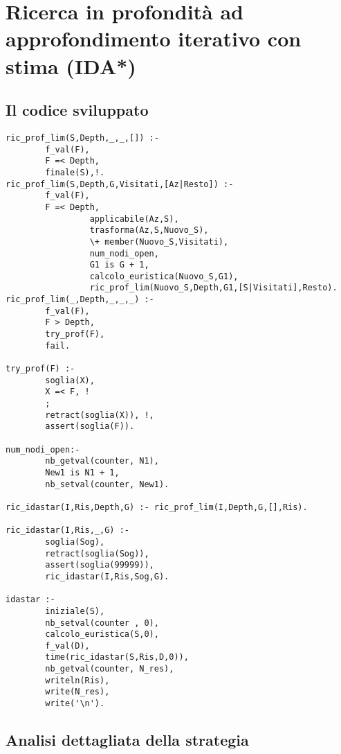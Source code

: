 \section{Ricerca in profondità ad approfondimento iterativo con stima (IDA*)}

\subsection{Il codice sviluppato}

\begin{lstlisting}
ric_prof_lim(S,Depth,_,_,[]) :-
        f_val(F),
        F =< Depth,
        finale(S),!.
ric_prof_lim(S,Depth,G,Visitati,[Az|Resto]) :-
        f_val(F),
        F =< Depth,
                 applicabile(Az,S),
                 trasforma(Az,S,Nuovo_S),
                 \+ member(Nuovo_S,Visitati),
                 num_nodi_open,
                 G1 is G + 1,
                 calcolo_euristica(Nuovo_S,G1),
                 ric_prof_lim(Nuovo_S,Depth,G1,[S|Visitati],Resto).
ric_prof_lim(_,Depth,_,_,_) :-
        f_val(F),
        F > Depth,
        try_prof(F),
        fail.

try_prof(F) :-
        soglia(X),
        X =< F, !
        ;
        retract(soglia(X)), !,
        assert(soglia(F)).

num_nodi_open:-
        nb_getval(counter, N1),
        New1 is N1 + 1,
        nb_setval(counter, New1).

ric_idastar(I,Ris,Depth,G) :- ric_prof_lim(I,Depth,G,[],Ris).

ric_idastar(I,Ris,_,G) :-
        soglia(Sog),
        retract(soglia(Sog)),
        assert(soglia(99999)),
        ric_idastar(I,Ris,Sog,G).

idastar :-
        iniziale(S),
        nb_setval(counter , 0),
        calcolo_euristica(S,0),
        f_val(D),
        time(ric_idastar(S,Ris,D,0)),
        nb_getval(counter, N_res),
        writeln(Ris),
        write(N_res),
        write('\n').
\end{lstlisting}

\subsection{Analisi dettagliata della strategia}

